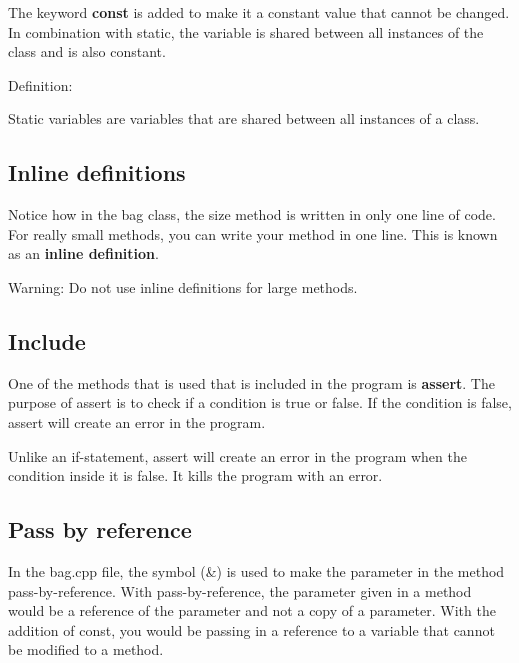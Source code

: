 \documentclass[11pt,a4paper,english]{paper}
\begin{document}
The keyword \textbf{const} is added to make it a constant value that cannot be changed. In combination with static, the variable is shared between all instances of the class and is also constant.

\bigskip

\begin{bluebox}{Definition:} {

    Static variables are variables that are shared between all instances of a class. 

  }
\end{bluebox}

\subsection{Inline definitions}

Notice how in the bag class, the size method is written in only one line of code. For really small methods, you can write your method in one line. This is known as an \textbf{inline definition}.
\bigskip

\begin{mybox}{Warning:}{
Do not use inline definitions for large methods.
  }
\end{mybox}

\subsection{Include}

One of the methods that is used that is included in the program is \textbf{assert}. The purpose of assert is to check if a condition is true or false. If the condition is false, assert will create an error in the program.

\bigskip

\noindent Unlike an if-statement, assert will create an error in the program when the condition inside it is false. It kills the program with an error.

\subsection{Pass by reference}

In the bag.cpp file, the symbol (\&) is used to make the parameter in the method pass-by-reference. With pass-by-reference, the parameter given in a method would be a reference of the parameter and not a copy of a parameter. With the addition of const, you would be passing in a reference to a variable that cannot be modified to a method.
\end{document}
